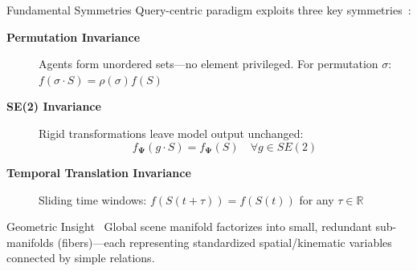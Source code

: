 \documentclass[10pt,aspectratio=169]{beamer}
\begin{document}
\begin{frame}{Fundamental Symmetries}
Query-centric paradigm exploits three key symmetries~\cite{qcnetZhou2023}:

\vspace{0.3cm}

\begin{description}
\item[\textbf{Permutation Invariance}]
Agents form unordered sets—no element privileged. For permutation $\sigma$: $f(\sigma \cdot S) = \rho(\sigma) f(S)$

\item[\textbf{SE(2) Invariance}]
Rigid transformations leave model output unchanged:
\begin{equation}
f_{\boldsymbol{\Psi}}(g \cdot S) = f_{\boldsymbol{\Psi}}(S) \quad \forall g \in SE(2)
\end{equation}

\item[\textbf{Temporal Translation Invariance}]
Sliding time windows: $f(S(t+\tau)) = f(S(t))$ for any $\tau \in \mathbb{R}$
\end{description}

\begin{block}{Geometric Insight~\cite{qcnetZhou2023}}
Global scene manifold factorizes into small, redundant sub-manifolds (fibers)—each representing standardized spatial/kinematic variables connected by simple relations.
\end{block}
\end{frame}
\end{document}
